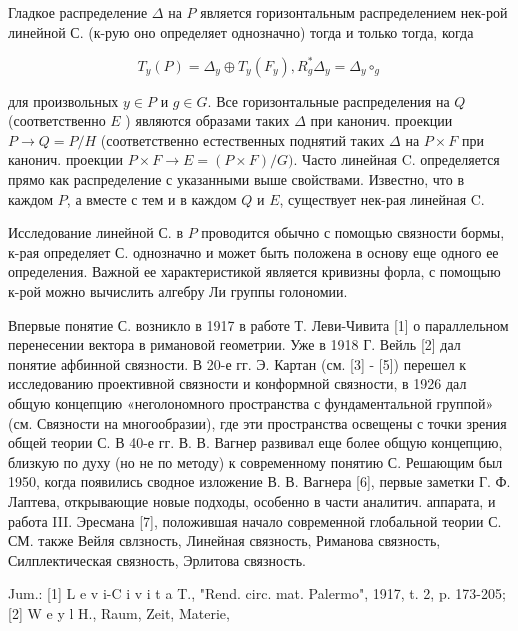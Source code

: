 \documentclass[10pt]{article}
\begin{document}
Гладкое распределение $\Delta$ на $P$ является горизонтальным распределением нек-рой линейной С. (к-рую оно определяет однозначно) тогда и только тогда, когда



\[

T_{y}(P)=\Delta_{y} \oplus T_{y}\left(F_{y}\right), R_{g}^{*} \Delta_{y}=\Delta_{y} \circ_{g}

\]



для произвольных $y \in P$ и $g \in G$. Все горизонтальные распределения на $Q$ (соответственно $E$ ) являются образами таких $\Delta$ при канонич. проекции $P \rightarrow Q=P / H$ (соответственно естественных поднятий таких $\Delta$ на $P \times F$ при канонич. проекции $P \times F \rightarrow E=(P \times F) / G)$. Часто линейная $\mathrm{C}$. определяется прямо как распределение с указанными выше свойствами. Известно, что в каждом $P$, а вместе с тем и в каждом $Q$ и $E$, существует нек-рая линейная $\mathrm{C}$.



Исследование линейной С. в $P$ проводится обычно с помощью связности бормы, к-рая определяет С. однозначно и может быть положена в основу еще одного ее определения. Важной ее характеристикой является кривизны форла, с помощыю к-рой можно вычислить алгебру Ли группы голономии.



Впервые понятие С. возникло в 1917 в работе Т. Леви-Чивита [1] о параллельном перенесении вектора в римановой геометрии. Уже в 1918 Г. Вейль [2] дал понятие афбинной связности. В 20-е гг. Э. Картан (см. [3] - [5]) перешел к исследованию проективной связности и конформной связности, в 1926 дал общую концепцию «неголономного пространства с фундаментальной группой» (см. Связности на многообразии), где эти пространства освещены с точки зрения общей теории С. В 40-е гг. В. В. Вагнер развивал еще более общую концепцию, близкую по духу (но не по методу) к современному понятию С. Решающим был 1950, когда появились сводное изложение В. В. Вагнера [6], первые заметки Г. Ф. Лаптева, открывающие новые подходы, особенно в части аналитич. аппарата, и работа III. Эресмана [7], положившая начало современной глобальной теории С. СМ. также Вейля свлзность, Линейная связность, Риманова связность, Силплектическая связность, Эрлитова связность.



Jum.: [1] L e v i-C i v i t a T., "Rend. circ. mat. Palermo", 1917, t. 2, p. 173-205; [2] W e y l H., Raum, Zeit, Materie,
\end{document}
